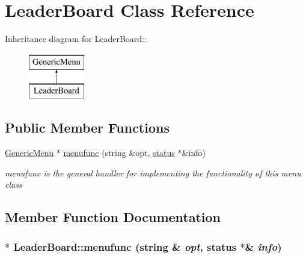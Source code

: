 \hypertarget{classLeaderBoard}{
\section{LeaderBoard Class Reference}
\label{classLeaderBoard}
}
Inheritance diagram for LeaderBoard::\begin{figure}[H]
\begin{center}
\leavevmode
\includegraphics[height=2cm]{classLeaderBoard}
\end{center}
\end{figure}
\subsection*{Public Member Functions}
\begin{DoxyCompactItemize}
\item 
\hyperlink{classGenericMenu}{GenericMenu} $\ast$ \hyperlink{classLeaderBoard_a848e37073627647d9ace936690d6e3bb}{menufunc} (string \&opt, \hyperlink{classstatus}{status} $\ast$\&info)
\begin{DoxyCompactList}\small\item\em menufunc is the general handler for implementing the functionality of this menu class \item\end{DoxyCompactList}\end{DoxyCompactItemize}


\subsection{Member Function Documentation}
\hypertarget{classLeaderBoard_a848e37073627647d9ace936690d6e3bb}{
\subsubsection[{menufunc}]{ $\ast$ LeaderBoard::menufunc (string \& {\em opt}, \/  {\bf status} $\ast$\& {\em info})}}
\label{classLeaderBoard_a848e37073627647d9ace936690d6e3bb}


